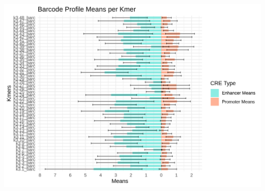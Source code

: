 \documentclass[
  letterpaper,
  DIV=11,
  numbers=noendperiod]{scrartcl}
\begin{document}
\begin{center}
\includegraphics[width=\textwidth,height=1\textheight]{gb-test-pdf_files/figure-pdf/unnamed-chunk-24-1.png}
\end{center}
\end{document}
